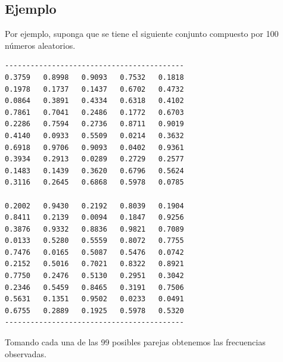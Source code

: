 \subsection{Ejemplo}
Por ejemplo, suponga que se tiene el siguiente conjunto compuesto por 100 números aleatorios.

\begin{verbatim}
------------------------------------------
0.3759   0.8998   0.9093   0.7532   0.1818
0.1978   0.1737   0.1437   0.6702   0.4732
0.0864   0.3891   0.4334   0.6318   0.4102
0.7861   0.7041   0.2486   0.1772   0.6703
0.2286   0.7594   0.2736   0.8711   0.9019
0.4140   0.0933   0.5509   0.0214   0.3632
0.6918   0.9706   0.9093   0.0402   0.9361
0.3934   0.2913   0.0289   0.2729   0.2577
0.1483   0.1439   0.3620   0.6796   0.5624
0.3116   0.2645   0.6868   0.5978   0.0785

0.2002   0.9430   0.2192   0.8039   0.1904
0.8411   0.2139   0.0094   0.1847   0.9256
0.3876   0.9332   0.8836   0.9821   0.7089
0.0133   0.5280   0.5559   0.8072   0.7755
0.7476   0.0165   0.5087   0.5476   0.0742
0.2152   0.5016   0.7021   0.8322   0.8921
0.7750   0.2476   0.5130   0.2951   0.3042
0.2346   0.5459   0.8465   0.3191   0.7506
0.5631   0.1351   0.9502   0.0233   0.0491
0.6755   0.2889   0.1925   0.5978   0.5320
------------------------------------------
\end{verbatim}


Tomando cada una de las 99 posibles parejas obtenemos las frecuencias observadas.
\begin{center}
\end{center}

